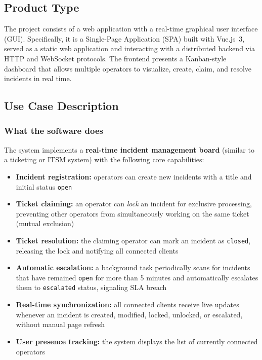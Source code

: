 \documentclass{scrartcl}
\begin{document}
\subsection{Product Type}

The project consists of a web application with a real-time graphical user interface (GUI).
Specifically, it is a Single-Page Application (SPA) built with Vue.js~3, served as a static web application and interacting with a distributed backend via HTTP and WebSocket protocols.
The frontend presents a Kanban-style dashboard that allows multiple operators to visualize, create, claim, and resolve incidents in real time.

\subsection{Use Case Description}

\subsubsection{What the software does}

The system implements a \textbf{real-time incident management board} (similar to a ticketing or ITSM system) with the following core capabilities:
%
\begin{itemize}
    \item \textbf{Incident registration:} operators can create new incidents with a title and initial status \texttt{open}
    \item \textbf{Ticket claiming:} an operator can \emph{lock} an incident for exclusive processing, preventing other operators from simultaneously working on the same ticket (mutual exclusion)
    \item \textbf{Ticket resolution:} the claiming operator can mark an incident as \texttt{closed}, releasing the lock and notifying all connected clients
    \item \textbf{Automatic escalation:} a background task periodically scans for incidents that have remained \texttt{open} for more than 5 minutes and automatically escalates them to \texttt{escalated} status, signaling SLA breach
    \item \textbf{Real-time synchronization:} all connected clients receive live updates whenever an incident is created, modified, locked, unlocked, or escalated, without manual page refresh
    \item \textbf{User presence tracking:} the system displays the list of currently connected operators
\end{itemize}
\end{document}
